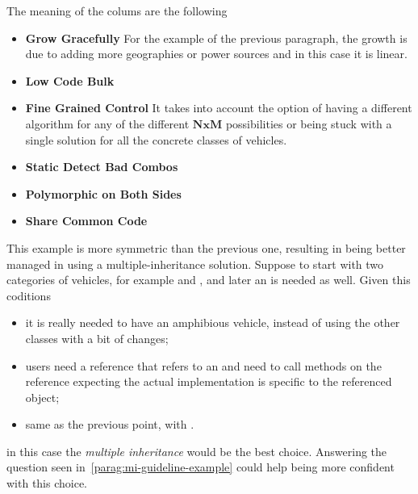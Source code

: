 The meaning of the colums are the following
\begin{itemize}
    \item \textbf{Grow Gracefully} \newline
    For the example of the previous paragraph, the growth is due to 
    adding more geographies or power sources and in this case it is 
    linear.
    
    \item \textbf{Low Code Bulk} \newline
    

    \item \textbf{Fine Grained Control} \newline
    It takes into account the option of having a different algorithm 
    for any of the different $\textbf{NxM}$ possibilities or being stuck 
    with a single solution for all the concrete classes of vehicles.

    \item \textbf{Static Detect Bad Combos} \newline
    

    \item \textbf{Polymorphic on Both Sides} \newline
    

    \item \textbf{Share Common Code} \newline
    
\end{itemize}




This example is more symmetric than the previous one, resulting in 
being better managed in using a multiple-inheritance solution.
\newline
Suppose to start with two categories of vehicles, for example 
 and , and later 
an  is needed as well.
\newline
Given this coditions
\begin{itemize}
    \item it is really needed to have an amphibious vehicle, instead of 
    using the other classes with a bit of changes;
    
    \item users need a  reference that refers 
    to an  and need to call methods on 
    the reference expecting the actual implementation is specific 
    to the referenced object;
    
    \item same as the previous point, with .

\end{itemize}
in this case the \textit{multiple inheritance} would be the best choice. 
Answering the question seen in~\ref{parag:mi-guideline-example} could 
help being more confident with this choice.

